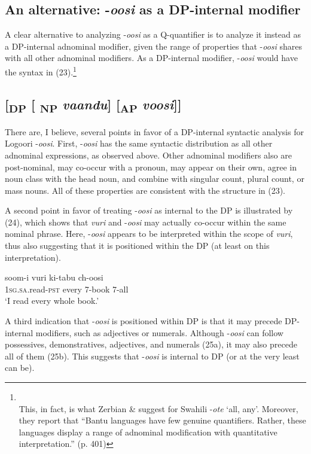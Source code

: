 \documentclass[output=paper]{langsci/langscibook}
\begin{document}
\subsection{An alternative: -\textit{oosi} as a DP-internal modifier}

A clear alternative to analyzing -\textit{oosi} as a Q-quantifier is to analyze it instead as a DP-internal adnominal modifier, given the range of properties that -\textit{oosi} shares with all other adnominal modifiers. As a DP-internal modifier, -\textit{oosi} would have the syntax in (23).\footnote{\\
 This, in fact, is what Zerbian \& \citet{Krifka2008} suggest for Swahili -\textit{ote} ‘all, any’. Moreover, they report that “Bantu languages have few genuine quantifiers. Rather, these languages display a range of adnominal modification with quantitative interpretation.” (p. 401)} 

\subsection{      [\textsubscript{DP} [\textsubscript{ NP} \textit{vaandu}] [\textsubscript{AP} \textit{voosi}]]}

  There are, I believe, several points in favor of a DP-internal syntactic analysis for Logoori -\textit{oosi}. First, -\textit{oosi} has the same syntactic distribution as all other adnominal expressions, as observed above. Other adnominal modifiers also are post-nominal, may co-occur with a pronoun, may appear on their own, agree in noun class with the head noun, and combine with singular count, plural count, or mass nouns. All of these properties are consistent with the structure in (23). 

  A second point in favor of treating -\textit{oosi} as internal to the DP is illustrated by (24), which shows that \textit{vuri} and -\textit{oosi} may actually co-occur within the same nominal phrase. Here, -\textit{oosi} appears to be interpreted within the scope of \textit{vuri}, thus also suggesting that it is positioned within the DP (at least on this interpretation).

\ea
\gll soom-i      vuri    ki-tabu  ch-oosi\\
     1\textsc{sg.sa}.read-\textsc{pst}  every    7-book  7-all \\
\glt ‘I read every whole book.’
\z

  A third indication that -\textit{oosi} is positioned within DP is that it may precede DP-internal modifiers, such as adjectives or numerals. Although -\textit{oosi} can follow possessives, demonstratives, adjectives, and numerals (25a), it may also precede all of them (25b). This suggests that -\textit{oosi} is internal to DP (or at the very least can be). 
\end{document}
